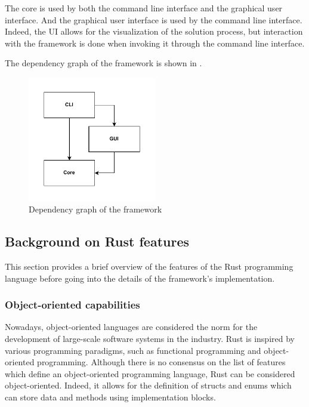 The core is used by both the command line interface and the graphical user interface. And the graphical user interface is used by the command line interface.
Indeed, the UI allows for the visualization of the solution process, but interaction with the framework is done when invoking it through the command line interface.

The dependency graph of the framework is shown in .

\begin{figure}
    \centering
    \includegraphics[width=0.5\textwidth]{Pictures/dependency}
    \caption{Dependency graph of the framework}
    \label{fig:dependency_graph}
\end{figure}

\subsection{Background on Rust features}

This section provides a brief overview of the features of the Rust programming language before going into the details of the framework's implementation.

\subsubsection{Object-oriented capabilities}

Nowadays, object-oriented languages are considered the norm for the development of large-scale software systems in the industry.
Rust is inspired by various programming paradigms, such as functional programming and object-oriented programming.
Although there is no consensus on the list of features which define an object-oriented programming language, Rust can be considered object-oriented.
Indeed, it allows for the definition of structs and enums which can store data and methods using implementation blocks.

